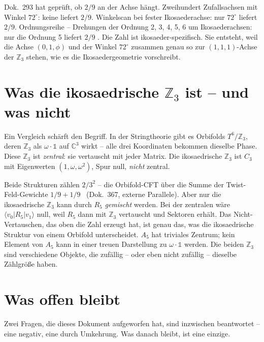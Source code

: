 Dok.~293 hat geprüft, ob $2/9$ an der Achse hängt. Zweihundert Zufallsachsen
mit Winkel $72^\circ$: keine liefert $2/9$. Winkelscan bei fester
Ikosaederachse: nur $72^\circ$ liefert $2/9$. Ordnungsreihe -- Drehungen der
Ordnung 2, 3, 4, 5, 6 um Ikosaederachsen: nur die Ordnung 5 liefert $2/9$ \KM.
Die Zahl ist ikosaeder-spezifisch. Sie entsteht, weil die Achse $(0,1,\phi)$
und der Winkel $72^\circ$ zusammen genau so zur $(1,1,1)$-Achse der
$\mathbb{Z}_3$ stehen, wie es die Ikosaedergeometrie vorschreibt.

\section{Was die ikosaedrische $\mathbb{Z}_3$ ist -- und was nicht}

Ein Vergleich schärft den Begriff. In der Stringtheorie gibt es Orbifolds
$T^6/\mathbb{Z}_3$, deren $\mathbb{Z}_3$ als $\omega\cdot\mathbb{1}$ auf
$\mathbb{C}^3$ wirkt -- alle drei Koordinaten bekommen dieselbe Phase. Diese
$\mathbb{Z}_3$ ist \emph{zentral}: sie vertauscht mit jeder Matrix. Die
ikosaedrische $\mathbb{Z}_3$ ist $C_3$ mit Eigenwerten $(1,\omega,\omega^2)$,
Spur null, \emph{nicht} zentral.

Beide Strukturen zählen $2/3^2$ -- die Orbifold-CFT über die Summe der
Twist-Feld-Gewichte $1/9+1/9$ \EM~(Dok.~367, externe Parallele). Aber nur die
ikosaedrische $\mathbb{Z}_3$ kann durch $R_5$ \emph{gemischt} werden. Bei der
zentralen wäre $\langle v_0|R_5|v_1\rangle$ null, weil $R_5$ dann mit
$\mathbb{Z}_3$ vertauscht und Sektoren erhält. Das Nicht-Vertauschen, das oben
die Zahl erzeugt hat, ist genau das, was die ikosaedrische Struktur von einem
Orbifold unterscheidet. $A_5$ hat triviales Zentrum; kein Element von $A_5$
kann in einer treuen Darstellung zu $\omega\cdot\mathbb{1}$ werden. Die beiden
$\mathbb{Z}_3$ sind verschiedene Objekte, die zufällig -- oder eben nicht
zufällig -- dieselbe Zählgröße haben.

\section{Was offen bleibt}

Zwei Fragen, die dieses Dokument aufgeworfen hat, sind inzwischen beantwortet
-- eine negativ, eine durch Umkehrung. Was danach bleibt, ist eine einzige.

